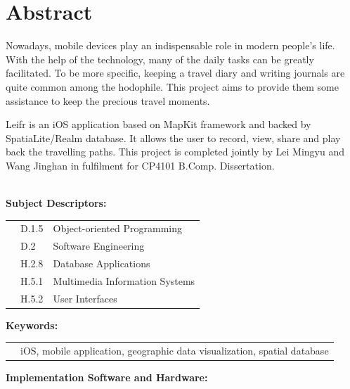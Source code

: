 \documentclass[12pt,a4paper]{article}
\begin{document}
	
	
    \section*{Abstract}
        Nowadays, mobile devices play an indispensable role in modern people's life. With the help of the technology, many of the daily tasks can be greatly facilitated. To be more specific, keeping a travel diary and writing journals are quite common among the hodophile. This project aims to provide them some assistance to keep the precious travel moments.
        
        Leifr is an iOS application based on MapKit framework and backed by SpatiaLite/Realm database. It allows the user to record, view, share and play back the travelling paths. This project is completed jointly by Lei Mingyu and Wang Jinghan in fulfilment for CP4101 B.Comp. Dissertation.\\~
        
        \textbf{Subject Descriptors:}
        
        \begin{tabular}{ p{1cm} p{1.5cm} p{10cm} }
            &D.1.5   &  Object-oriented Programming \\
            &D.2     &  Software Engineering    \\
            &H.2.8   &  Database Applications   \\
            &H.5.1   &  Multimedia Information Systems  \\
            &H.5.2   &  User Interfaces \\
        \end{tabular}
        
        \vspace{1cm}
        
        \textbf{Keywords:}
        
        \begin{tabular}{ p{1cm} p{12.8cm} }
            &iOS, mobile application, geographic data visualization, spatial database \\
        \end{tabular}
        
        \vspace{1cm}
        
        \textbf{Implementation Software and Hardware:}
        
\end{document}
